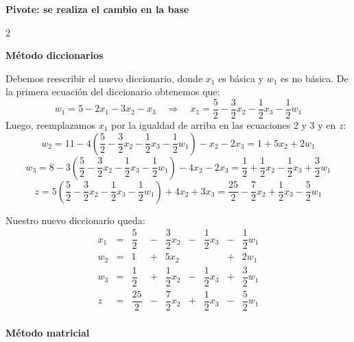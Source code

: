 \documentclass{article}
\begin{document}
    \begin{center}
        \textbf{Pivote: se realiza el cambio en la base}
    \end{center}
    \begin{multicols}{2}
        \raggedcolumns
        \begin{center}
            \textbf{Método diccionarios}
        \end{center}

            Debemos reescribir el nuevo diccionario, donde $x_1$ es básica y $w_1$ es no básica.
            De la primera ecuación del diccionario obtenemos que:
            \[ w_1  =  5 - 2x_1 - 3x_2 - x_3 \quad \Rightarrow \quad x_1 = \frac{5}{2} - \frac{3}{2}x_2 -\frac{1}{2}x_3 -
            \frac{1}{2} w_1  \]
            Luego, reemplazamos $x_1$ por la igualdad de arriba en las ecuaciones 2 y 3 y en $z$:
            \[ w_2 = 11 - 4\left(\frac{5}{2} - \frac{3}{2}x_2 -\frac{1}{2}x_3 -\frac{1}{2} w_1 \right)
            - x_2 - 2x_3 = 1+5x_2+2w_1  \]
            \[w_3 = 8 - 3\left(\frac{5}{2} - \frac{3}{2}x_2 -\frac{1}{2}x_3 -\frac{1}{2} w_1 \right) - 4x_2 - 2x_3 =
            \frac{1}{2}+\frac{1}{2}x_2-\frac{1}{2}x_3+\frac{3}{2}w_1\]
            \[z  = 5\left(\frac{5}{2} - \frac{3}{2}x_2 -\frac{1}{2}x_3 -\frac{1}{2} w_1\right) + 4x_2 + 3x_3 = \frac{25}{2}-
            \frac{7}{2}x_2+\frac{1}{2}x_3-\frac{5}{2}w_1 \]

            Nuestro nuevo diccionario queda:
            \[
                \begin{array}{rrrrrrrrr}
                    x_1 & = & \dfrac{5}{2}  & - & \dfrac{3}{2}x_2 & - & \dfrac{1}{2}x_3 & - & \dfrac{1}{2} w_1 \\
                    w_2 & = & 1            & + & 5x_2           &   &                & + & 2w_1            \\
                    w_3 & = & \dfrac{1}{2}  & + & \dfrac{1}{2}x_2 & - & \dfrac{1}{2}x_3 & + & \dfrac{3}{2}w_1  \\[0.5em]\hline
                    z   & = & \dfrac{25}{2} & - & \dfrac{7}{2}x_2 & + & \dfrac{1}{2}x_3 & - & \dfrac{5}{2}w_1  \\
                \end{array}
            \]

        \columnbreak
        \begin{center}
            \textbf{Método matricial}
        \end{center}


\end{multicols}
\end{document}
